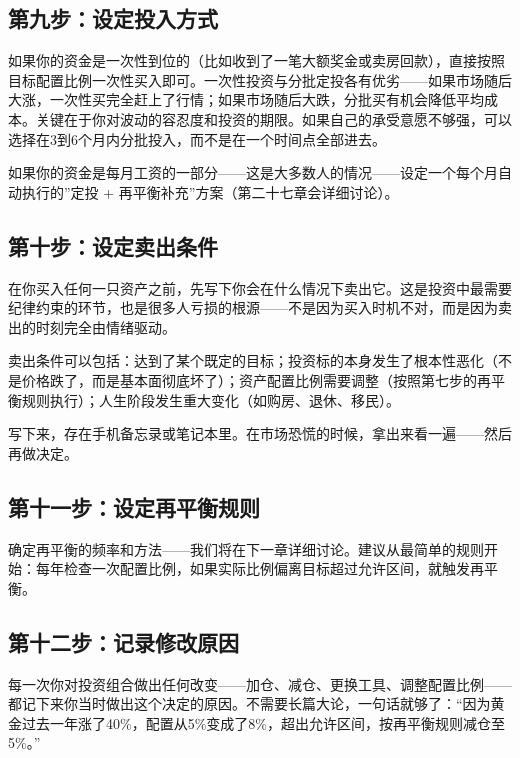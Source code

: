 \documentclass[a4paper,11pt,oneside,fontset=none,UTF8,zihao=-4]{ctexbook}
\begin{document}
\subsection{第九步：设定投入方式}\label{ux7b2cux4e5dux6b65ux8bbeux5b9aux6295ux5165ux65b9ux5f0f}

如果你的资金是一次性到位的（比如收到了一笔大额奖金或卖房回款），直接按照目标配置比例一次性买入即可。一次性投资与分批定投各有优劣------如果市场随后大涨，一次性买完全赶上了行情；如果市场随后大跌，分批买有机会降低平均成本。关键在于你对波动的容忍度和投资的期限。如果自己的承受意愿不够强，可以选择在3到6个月内分批投入，而不是在一个时间点全部进去。

如果你的资金是每月工资的一部分------这是大多数人的情况------设定一个每个月自动执行的''定投
+ 再平衡补充''方案（第二十七章会详细讨论）。

\subsection{第十步：设定卖出条件}\label{ux7b2cux5341ux6b65ux8bbeux5b9aux5356ux51faux6761ux4ef6}

在你买入任何一只资产之前，先写下你会在什么情况下卖出它。这是投资中最需要纪律约束的环节，也是很多人亏损的根源------不是因为买入时机不对，而是因为卖出的时刻完全由情绪驱动。

卖出条件可以包括：达到了某个既定的目标；投资标的本身发生了根本性恶化（不是价格跌了，而是基本面彻底坏了）；资产配置比例需要调整（按照第七步的再平衡规则执行）；人生阶段发生重大变化（如购房、退休、移民）。

写下来，存在手机备忘录或笔记本里。在市场恐慌的时候，拿出来看一遍------然后再做决定。

\subsection{第十一步：设定再平衡规则}\label{ux7b2cux5341ux4e00ux6b65ux8bbeux5b9aux518dux5e73ux8861ux89c4ux5219}

确定再平衡的频率和方法------我们将在下一章详细讨论。建议从最简单的规则开始：每年检查一次配置比例，如果实际比例偏离目标超过允许区间，就触发再平衡。

\subsection{第十二步：记录修改原因}\label{ux7b2cux5341ux4e8cux6b65ux8bb0ux5f55ux4feeux6539ux539fux56e0}

每一次你对投资组合做出任何改变------加仓、减仓、更换工具、调整配置比例------都记下来你当时做出这个决定的原因。不需要长篇大论，一句话就够了：``因为黄金过去一年涨了40\%，配置从5\%变成了8\%，超出允许区间，按再平衡规则减仓至5\%。''
\end{document}
